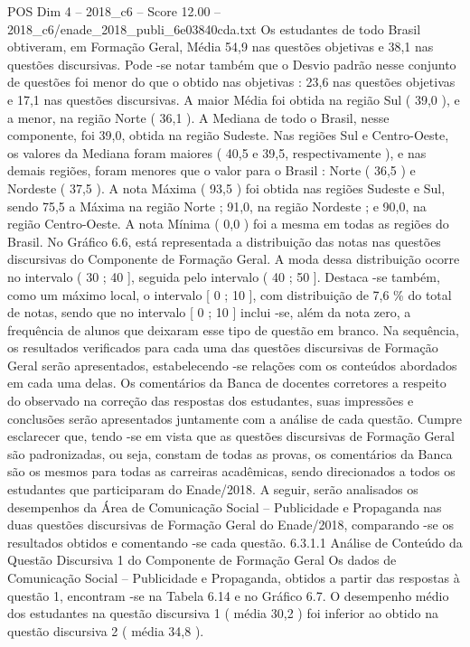 \begin{textsample}{POS Dim 4 – 2018\_c6 – Score 12.00 – 2018\_c6/enade\_2018\_publi\_6e03840cda.txt}
Os estudantes de todo Brasil obtiveram, em Formação Geral, Média 54,9 nas questões objetivas e 38,1 nas questões discursivas.
Pode -se notar também que o Desvio padrão nesse conjunto de questões foi menor do que o obtido nas objetivas : 23,6 nas questões objetivas e 17,1 nas questões discursivas.
A maior Média foi obtida na região Sul ( 39,0 ), e a menor, na região Norte ( 36,1 ).
A Mediana de todo o Brasil, nesse componente, foi 39,0, obtida na região Sudeste.
Nas regiões Sul e Centro-Oeste, os valores da Mediana foram maiores ( 40,5 e 39,5, respectivamente ), e nas demais regiões, foram menores que o valor para o Brasil : Norte ( 36,5 ) e Nordeste ( 37,5 ).
A nota Máxima ( 93,5 ) foi obtida nas regiões Sudeste e Sul, sendo 75,5 a Máxima na região Norte ; 91,0, na região Nordeste ; e 90,0, na região Centro-Oeste.
A nota Mínima ( 0,0 ) foi a mesma em todas as regiões do Brasil.
No Gráfico 6.6, está representada a distribuição das notas nas questões discursivas do Componente de Formação Geral.
A moda dessa distribuição ocorre no intervalo ( 30 ; 40 ], seguida pelo intervalo ( 40 ; 50 ].
Destaca -se também, como um máximo local, o intervalo [ 0 ; 10 ], com distribuição de 7,6 \% do total de notas, sendo que no intervalo [ 0 ; 10 ] inclui -se, além da nota zero, a frequência de alunos que deixaram esse tipo de questão em branco.
Na sequência, os resultados verificados para cada uma das questões discursivas de Formação Geral serão apresentados, estabelecendo -se relações com os conteúdos abordados em cada uma delas.
Os comentários da Banca de docentes corretores a respeito do observado na correção das respostas dos estudantes, suas impressões e conclusões serão apresentados juntamente com a análise de cada questão.
Cumpre esclarecer que, tendo -se em vista que as questões discursivas de Formação Geral são padronizadas, ou seja, constam de todas as provas, os comentários da Banca são os mesmos para todas as carreiras acadêmicas, sendo direcionados a todos os estudantes que participaram do Enade/2018.
A seguir, serão analisados os desempenhos da Área de Comunicação Social – Publicidade e Propaganda nas duas questões discursivas de Formação Geral do Enade/2018, comparando -se os resultados obtidos e comentando -se cada questão. 6.3.1.1 Análise de Conteúdo da Questão Discursiva 1 do Componente de Formação Geral Os dados de Comunicação Social – Publicidade e Propaganda, obtidos a partir das respostas à questão 1, encontram -se na Tabela 6.14 e no Gráfico 6.7.
O desempenho médio dos estudantes na questão discursiva 1 ( média 30,2 ) foi inferior ao obtido na questão discursiva 2 ( média 34,8 ).

\end{textsample}
